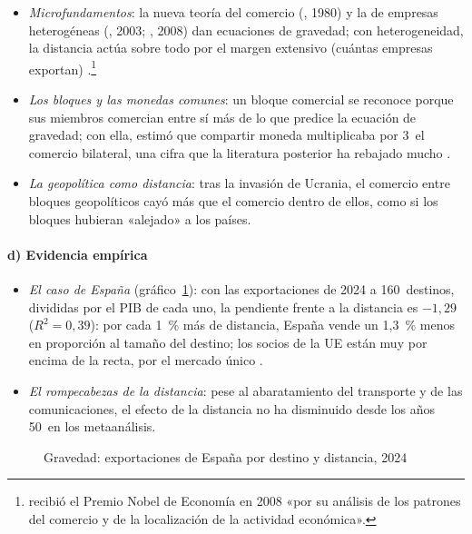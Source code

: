 \documentclass[11pt]{article}
\begin{document}
\begin{itemize}
\item \emph{Microfundamentos}: la nueva teoría del comercio (, 1980) y la de empresas heterogéneas (, 2003; , 2008) dan ecuaciones de gravedad; con heterogeneidad, la distancia actúa sobre todo por el margen extensivo (cuántas empresas exportan)\nocite{Chaney2008Distorted} .\footnote{ recibió el Premio Nobel de Economía en 2008 «por su análisis de los patrones del comercio y de la localización de la actividad económica»\nocite{Nobel2008Krugman}.}
\item \emph{Los bloques y las monedas comunes}: un bloque comercial se reconoce porque sus miembros comercian entre sí más de lo que predice la ecuación de gravedad; con ella, \textcite{Rose2000One} estimó que compartir moneda multiplicaba por 3~el comercio bilateral, una cifra que la literatura posterior ha rebajado mucho .
\item \emph{La geopolítica como distancia}: tras la invasión de Ucrania, el comercio entre bloques geopolíticos cayó más que el comercio dentro de ellos, como si los bloques hubieran «alejado» a los países\nocite{Gopinath2025Linkages}.
\end{itemize}

\paragraph{d) Evidencia empírica}

\begin{itemize}
\item \emph{El caso de España} (gráfico~\ref{fig:gravedad}): con las exportaciones de 2024 a 160~destinos, divididas por el PIB de cada uno, la pendiente frente a la distancia es $-1{,}29$ ($R^2=0{,}39$): por cada 1~\% más de distancia, España vende un 1,3~\% menos en proporción al tamaño del destino; los socios de la UE están muy por encima de la recta, por el mercado único\nocite{UNComtrade2026} .
\item \emph{El rompecabezas de la distancia}: pese al abaratamiento del transporte y de las comunicaciones, el efecto de la distancia no ha disminuido desde los años 50~en los metaanálisis\nocite{DisdierHead2008Puzzling}.
\end{itemize}

\begin{figure}[H]
\centering
\caption{Gravedad: exportaciones de España por destino y distancia, 2024}\label{fig:gravedad}
\end{figure}
\end{document}
